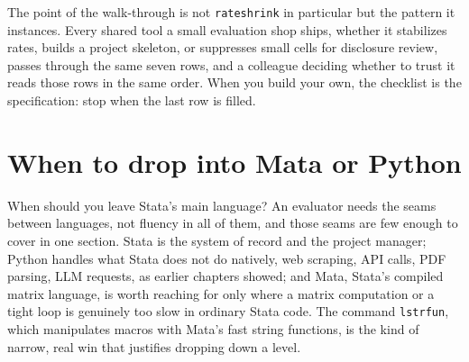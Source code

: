 \documentclass[
    a4paper,
    fontsize=10pt,
    twoside=true,
    numbers=noenddot,
]{kaobook}
\begin{document}
The point of the walk-through is not \texttt{rateshrink} in particular but the pattern it instances. Every shared tool a small evaluation shop ships, whether it stabilizes rates, builds a project skeleton, or suppresses small cells for disclosure review, passes through the same seven rows, and a colleague deciding whether to trust it reads those rows in the same order. When you build your own, the checklist is the specification: stop when the last row is filled.

\section{When to drop into Mata or Python}
When should you leave Stata's main language? An evaluator needs the seams between languages, not fluency in all of them, and those seams are few enough to cover in one section. Stata is the system of record and the project manager; Python handles what Stata does not do natively, web scraping, API calls, PDF parsing, LLM requests, as earlier chapters showed; and Mata, Stata's compiled matrix language, is worth reaching for only where a matrix computation or a tight loop is genuinely too slow in ordinary Stata code. The command \texttt{lstrfun}, which manipulates macros with Mata's fast string functions, is the kind of narrow, real win that justifies dropping down a level.
\end{document}
